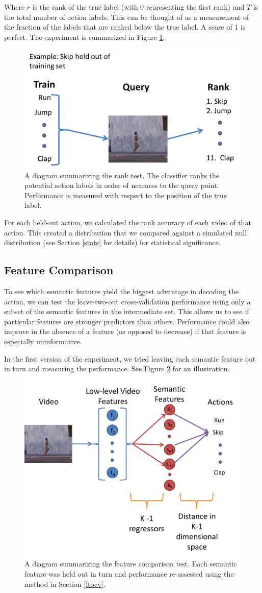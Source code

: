 \documentclass{article}
\begin{document}
Where $r$ is the rank of the true label (with $0$ representing the first rank) and $T$ is the total number of action labels.  This can be thought of as a measurement of the fraction of the labels that are ranked below the true label. A score of 1 is perfect. The experiment is summarized in Figure \ref{ranking}.

\begin{figure}[h]
  \centering
  \includegraphics[width = .45\linewidth]{ranking}
  \caption{A diagram summarizing the rank test. The classifier ranks the potential action labels in order of nearness to the query point. Performance is measured with respect to the position of the true label.}
  \label{ranking}
\end{figure}
\label{rank}

For each held-out action, we calculated the rank accuracy of each video of that action. This created a distribution that we compared against a simulated null distribution (see Section \ref{stats} for details) for statistical significance.

\subsection{Feature Comparison}
To see which semantic features yield the biggest advantage in decoding the action, we can test the leave-two-out cross-validation performance using only a subset of the semantic features in the intermediate set. This allows us to see if particular features are stronger predictors than others.  Performance could also improve in the absence of a feature (as opposed to decrease) if that feature is especially uninformative.

In the first version of the experiment, we tried leaving each semantic feature out in turn and measuring the performance. See Figure \ref{feature} for an illustration.

\begin{figure}[h]
  \centering
  \includegraphics[width = .45\linewidth]{features}
  \caption{A diagram summarizing the feature comparison test. Each semantic feature was held out in turn and performance re-assessed using the method in Section \ref{ltocv}.}
  \label{feature}
\end{figure}
\end{document}
